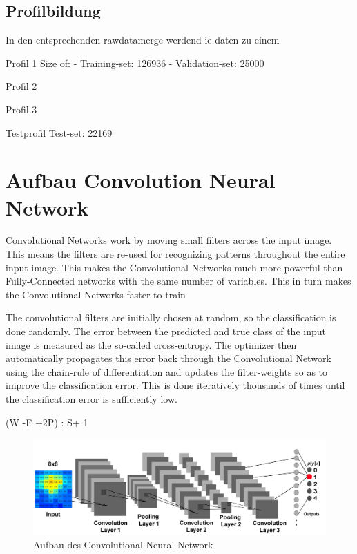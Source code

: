 \subsection{Profilbildung}

In den entsprechenden rawdatamerge werdend ie daten zu einem 



Profil 1
Size of:
- Training-set:         126936
- Validation-set:       25000

Profil 2



Profil 3


Testprofil Test-set:             22169




\section{Aufbau Convolution Neural Network}




Convolutional Networks work by moving small filters across the input image. This means the filters are re-used for recognizing patterns throughout the entire input image. This makes the Convolutional Networks much more powerful than Fully-Connected networks with the same number of variables. This in turn makes the Convolutional Networks faster to train




The convolutional filters are initially chosen at random, so the classification is done randomly. The error between the predicted and true class of the input image is measured as the so-called cross-entropy. The optimizer then automatically propagates this error back through the Convolutional Network using the chain-rule of differentiation and updates the filter-weights so as to improve the classification error. This is done iteratively thousands of times until the classification error is sufficiently low.


(W -F +2P) : S+ 1



\begin{figure}[H]
	\centering
	\includegraphics[width=1\textwidth]
	{fig/CNN_broschuere.jpg}
	\caption[Aufbau des Convolutional Neural Network]{Aufbau des Convolutional Neural Network}
	\label{fig:CCN}
\end{figure}




